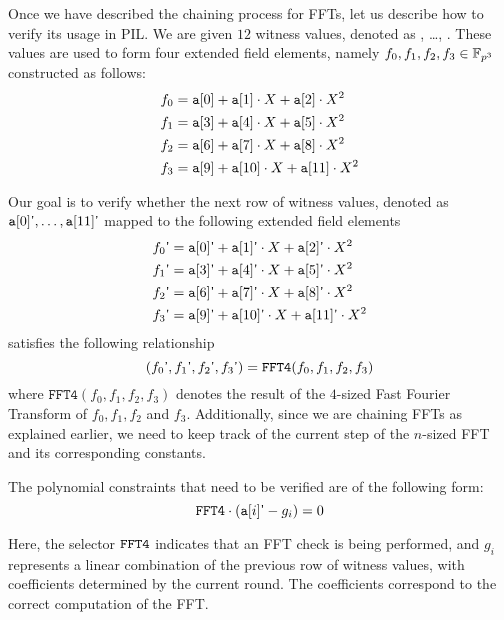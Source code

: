 Once we have described the chaining process for FFTs, let us describe how to verify its usage in PIL. We are given $12$ witness values, denoted as \acode{[0]}, \dots, \acode{[11]}. These values are used to form four extended field elements, namely $f_0, f_1, f_2, f_3 \in \mathbb{F}_{p^3}$ constructed as follows:
\begin{align*}
&f_0 = \texttt{a}{[0]} + \texttt{a}{[1]} \cdot X + \texttt{a}{[2]} \cdot X^2 \\
&f_1 = \texttt{a}{[3]} + \texttt{a}{[4]} \cdot X + \texttt{a}{[5]} \cdot X^2 \\
&f_2 = \texttt{a}{[6]} + \texttt{a}{[7]} \cdot X + \texttt{a}{[8]} \cdot X^2 \\
&f_3 = \texttt{a}{[9]} + \texttt{a}{[10]} \cdot X + \texttt{a}{[11]} \cdot X^2
\end{align*}

Our goal is to verify whether the next row of witness values, denoted as $\texttt{a}[0] \textsf{'}, \dots, \texttt{a}[11] \textsf{'}$ mapped to the following extended field elements
\begin{align*}
&f_0 \textsf{'} = \texttt{a}[0] \textsf{'} + \texttt{a}[1] \textsf{'} \cdot X + \texttt{a}[2] \textsf{'} \cdot X^2 \\
&f_1 \textsf{'} = \texttt{a}[3] \textsf{'} + \texttt{a}[4] \textsf{'} \cdot X + \texttt{a}[5] \textsf{'} \cdot X^2 \\
&f_2 \textsf{'} = \texttt{a}[6] \textsf{'} + \texttt{a}[7] \textsf{'} \cdot X + \texttt{a}[8] \textsf{'} \cdot X^2 \\
&f_3 \textsf{'} = \texttt{a}[9] \textsf{'} + \texttt{a}[10] \textsf{'} \cdot X + \texttt{a}[11] \textsf{'} \cdot X^2
\end{align*}
satisfies the following relationship 
\[
(f_0 \textsf{'}, f_1 \textsf{'}, f_2 \textsf{'}, f_3 \textsf{'}) = \texttt{FFT4}(f_0 , f_1, f_2, f_3)
\]
where $\texttt{FFT4}(f_0, f_1, f_2, f_3)$ denotes the result of the $4$-sized Fast Fourier Transform of $f_0, f_1, f_2$ and $f_3$. Additionally, since we are chaining FFTs as explained earlier, we need to keep track of the current step of the $n$-sized FFT and its corresponding constants.

The polynomial constraints that need to be verified are of the following form:
\[
\texttt{FFT4} \cdot ( \texttt{a}[i] \textsf{'} - g_i) = 0
\]

Here, the selector $\texttt{FFT4}$ indicates that an FFT check is being performed, and $g_i$ represents a linear combination of the previous row of witness values, with coefficients determined by the current round. The coefficients correspond to the correct computation of the FFT.

